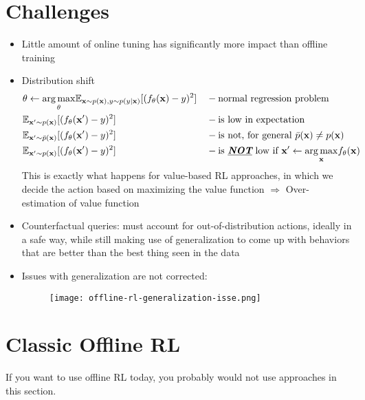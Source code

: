 \section{Challenges}
\begin{itemize}
	\item Little amount of online tuning has significantly more impact than offline training \cite{kalashnikov2018qt}
	\item Distribution shift\\
	\begin{align*}
		&\theta \leftarrow \underset{\theta}{\arg\max} \mathbb{E}_{\textbf{x}\sim p(\textbf{x}), y \sim p(y|\textbf{x})} [(f_\theta(\textbf{x})-y)^2] && -\text{normal regression problem}\\
		&\mathbb{E}_{\textbf{x}'\sim p(\textbf{x})} [(f_\theta(\textbf{x}')-y)^2] &&-\text{is low in expectation}\\
		&\mathbb{E}_{\textbf{x}'\sim \bar{p}(\textbf{x})} [(f_\theta(\textbf{x}')-y)^2] &&-\text{is not, for general $\bar{p}(\textbf{x}) \neq p(\textbf{x})$}\\
		&\mathbb{E}_{\textbf{x}'\sim p(\textbf{x})} [(f_\theta(\textbf{x}')-y)^2] &&-\text{is \textbf{\emph{\underline{NOT}}} low if $\textbf{x}' \leftarrow \underset{\textbf{x}}{\arg\max} f_\theta(\textbf{x})$}\\
	\end{align*}
	This is exactly what happens for value-based \ac{RL} approaches, in which we decide the action based on maximizing the value function $\Rightarrow$ Over-estimation of value function \cite{kumar2019stabilizing}
	\item Counterfactual queries: must account for out-of-distribution actions, ideally in a safe way, while still making use of generalization to come up with behaviors that are better than the best thing seen in the data \cite{levine2020offline}
	\item Issues with generalization are not corrected:
	\begin{figure}[hbt!]
		\centering
		\texttt{[image: offline-rl-generalization-isse.png]}
	\end{figure}	
\end{itemize}

\section{Classic Offline RL}
If you want to use offline \ac{RL} today, you probably would not use approaches in this section.

